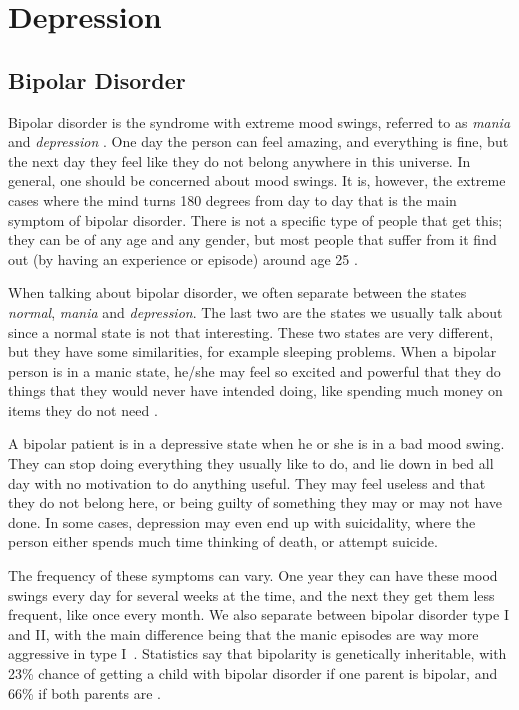 \section{Depression}
\subsection{Bipolar Disorder}

Bipolar disorder is the syndrome with extreme mood swings, referred to as \emph{mania} and \emph{depression} \cite{bipolar_disorder}. One day the person can feel amazing, and everything is fine, 
but the next day they feel like they do not belong anywhere in this universe. In general, one should be concerned about mood swings. 
It is, however, the extreme cases where the mind turns 180 degrees from day to day that is the main symptom of bipolar disorder. 
There is not a specific type of people that get this; they can be of any age and any gender, but most people that suffer from it find out 
(by having an experience or episode) around age 25 \cite{bipolar_statistics}. 

When talking about bipolar disorder, we often separate between the states \emph{normal}, \emph{mania} and \emph{depression}. 
The last two are the states we usually talk about since a normal state is not that interesting. These two states are very different, 
but they have some similarities, for example sleeping problems. When a bipolar person is in a manic state, he/she may feel so excited and powerful that they do things that they would never have intended doing, like spending much money on items they do 
not need \cite{bipolar_disorder}.

A bipolar patient is in a depressive state when he or she is in a bad mood swing. They can stop doing everything they usually like to do, 
and lie down in bed all day with no motivation to do anything useful. They may feel useless and that they do not belong here, 
or being guilty of something they may or may not have done. In some cases, depression may even end up with suicidality, 
where the person either spends much time thinking of death, or attempt suicide.

The frequency of these symptoms can vary. One year they can have these mood swings every day for several weeks at the time, and the next they get them less frequent, 
like once every month. We also separate between bipolar disorder type I and II, with the main difference being that the manic episodes are way 
more aggressive in type I \cite{bipolar_types}. Statistics say that bipolarity is genetically inheritable, with 23\% chance of getting a child with bipolar 
disorder if one parent is bipolar, and 66\% if both parents are \cite{bipolar_statistics}. 


